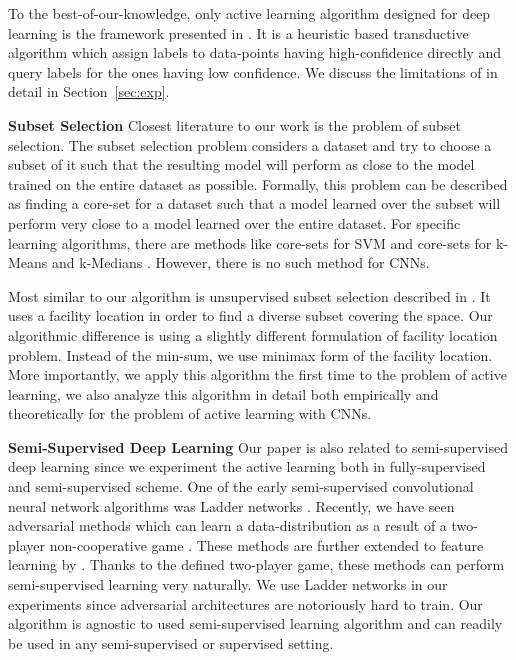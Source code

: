 \documentclass{article}
\begin{document}
To the best-of-our-knowledge, only active learning algorithm designed for deep learning is the framework presented in \cite{wang2016cost}. It is a heuristic based transductive algorithm which assign labels to data-points having high-confidence directly and query labels for the ones having low confidence. We discuss the limitations of \cite{wang2016cost} in detail in Section~\ref{sec:exp}.


\noindent\textbf{Subset Selection}
Closest literature to our work is the problem of subset selection. The subset selection problem considers a dataset and try to choose a subset of it such that the resulting model will perform as close to the model trained on the entire dataset as possible. Formally, this problem can be described as finding a core-set for a dataset such that a model learned over the subset will perform very close to a model learned over the entire dataset. For specific learning algorithms, there are methods like core-sets for SVM \cite{tsang2005core} and core-sets for k-Means and k-Medians \cite{har2005smaller}. However, there is no such method for CNNs.

Most similar to our algorithm is unsupervised subset selection described in \cite{wei2013using}. It uses a facility location in order to find a diverse subset covering the space. Our algorithmic difference is using a slightly different formulation of facility location problem. Instead of the min-sum, we use minimax \cite{facility} form of the facility location. More importantly, we apply this algorithm the first time to the problem of active learning, we also analyze this algorithm in detail both empirically and theoretically for the problem of active learning with CNNs.

 
\noindent\textbf{Semi-Supervised Deep Learning}
Our paper is also related to semi-supervised deep learning since we experiment the active learning both in fully-supervised and semi-supervised scheme. 
One of the early semi-supervised convolutional neural network algorithms was Ladder networks \cite{ladder}. Recently, we have seen adversarial methods which can learn a data-distribution as a result of a two-player non-cooperative game \cite{salimans2016improved,gan_original,dcgan}. These methods are further extended to feature learning by \cite{ali, bigan}. Thanks to the defined two-player game, these methods can perform semi-supervised learning very naturally. We use Ladder networks in our experiments since adversarial architectures are notoriously hard to train. Our algorithm is agnostic to used semi-supervised learning algorithm and can readily be used in any semi-supervised or supervised setting.
\end{document}
